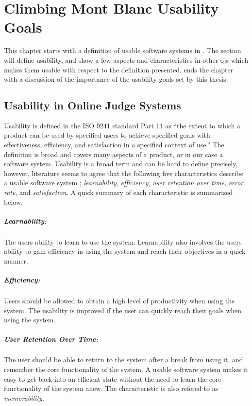 \chapter{Climbing Mont Blanc Usability Goals}
\label{ch:design}
This chapter starts with a definition of usable software systems in . The section will define usability, and show a few aspects and characteristics in other \glspl{oj} which makes them usable with respect to the definition presented.  ends the chapter with a discussion of the importance of the usability goals set by this thesis.

\section{Usability in Online Judge Systems}
\label{sec:usability-def}
Usability is defined in the ISO 9241 standard Part 11 \cite{ISO1998} as ``the extent to which a product can be used by specified users to achieve specified goals with effectiveness, efficiency, and satisfaction in a specified context of use.'' The definition is broad and covers many aspects of a product, or in our case a software system. Usability is a broad term and can be hard to define precisely, however, literature seems to agree that the following five characteristics describe a usable software system  \cite{holzinger2005, ferre2001}; \textit{learnability}, \textit{efficiency}, \textit{user retention over time}, \textit{error rate}, and \textit{satisfaction}. A quick summary of each characteristic is summarized below.

\paragraph*{Learnability:} The users ability to learn to use the system. Learnability also involves the users ability to gain efficiency in using the system and reach their objectives in a quick manner.

\paragraph*{Efficiency:} Users should be allowed to obtain a high level of productivity when using the system. The usability is improved if the user can quickly reach their goals when using the system.

\paragraph*{User Retention Over Time:} The user should be able to return to the system after a break from using it, and remember the core functionality of the system. A usable software system makes it easy to get back into an efficient state without the need to learn the core functionality of the system anew. The characteristic is also refered to as \textit{memorability}.

